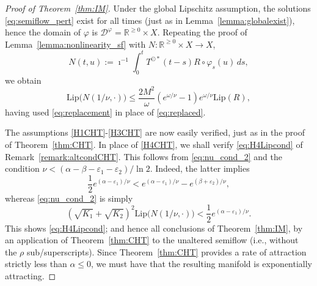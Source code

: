 \documentclass[a4paper, 12pt, oneside, reqno, notitlepage]{amsart}
\theoremstyle{plain}
\theoremstyle{definition}
\theoremstyle{remark}
\newcommand{\lip}{\mathrm{Lip}}
\begin{document}
\begin{proof}[Proof of Theorem~\ref{thm:IM}]
    Under the global Lipschitz assumption, the solutions \eqref{eq:semiflow_pert} exist for all times (just as in Lemma~\ref{lemma:globalexist}), hence the domain of $\varphi$ is $\mathcal{D}^\varphi = \mathbb{R}^{\geq 0} \times X$.
    Repeating the proof of Lemma~\ref{lemma:nonlinearity_sf}
    with
    $N: \mathbb{R}^{\geq 0} \times X \to X$,
    \begin{displaymath}
        N(t,u ) := \imath^{-1} \int_0^t T^{\odot *}(t-s) R \circ \varphi_s(u) \, ds,
    \end{displaymath}
    we obtain
    \begin{equation}
        \lip\big(N(1/\nu,\cdot)\big) \leq \frac{2M^2}{\omega} \left( e^{\omega /\nu} - 1 \right)  e^{\omega /\nu} \lip(R),
        \label{eq:LipN_IM}
    \end{equation}
    having used \eqref{eq:replacement} in place of \eqref{eq:replaced}. 
    
    
    The assumptions \ref{H1CHT}-\ref{H3CHT} are now easily verified, just as in the proof of Theorem~\ref{thm:CHT}.
    In place of \ref{H4CHT}, we shall verify \eqref{eq:H4Lipcond} of Remark~\ref{remark:altcondCHT}.
    This follows from \eqref{eq:nu_cond_2} and the condition   $\nu < (\alpha - \beta - \varepsilon_1 - \varepsilon_2)/ \ln 2$.
    Indeed, the latter implies
    \begin{displaymath}
      \frac{1}{2} e^{( \alpha - \varepsilon_1)/\nu} <  e^{( \alpha - \varepsilon_1) / \nu} - e^{(\beta + \varepsilon_2) / \nu},
    \end{displaymath}
    whereas \eqref{eq:nu_cond_2} is simply
    \begin{displaymath}
        \left(\sqrt{K_1} + \sqrt{K_2} \right)^2\lip\big(N(1/\nu,\cdot)\big) < \frac{1}{2} e^{( \alpha - \varepsilon_1) / \nu}.
    \end{displaymath}
    This shows \eqref{eq:H4Lipcond}; and hence all conclusions of Theorem~\ref{thm:IM}, by an application of Theorem~\ref{thm:CHT} to the unaltered semiflow (i.e., without the $\rho$ sub/superscripts).
    Since Theorem~\ref{thm:CHT} provides a rate of attraction strictly less than $\alpha \leq 0$, we must have that the resulting manifold is exponentially attracting. 
\end{proof}
\end{document}
